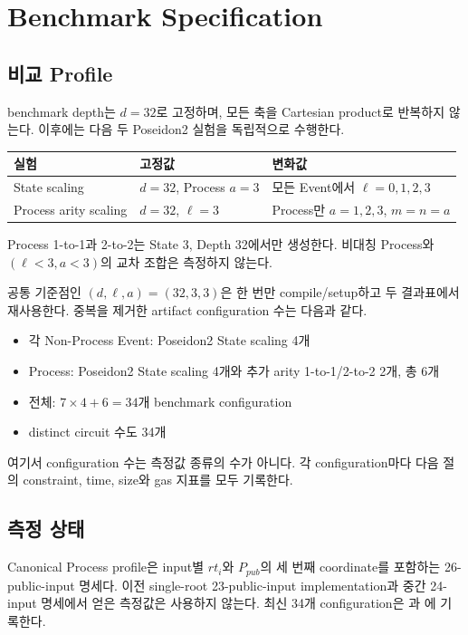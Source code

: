 \documentclass[11pt,a4paper]{extarticle}
\begin{document}
\section{Benchmark Specification}

\subsection{비교 Profile}

benchmark depth는 $d=32$로 고정하며, 모든 축을 Cartesian product로 반복하지 않는다.
이후에는 다음 두 Poseidon2 실험을 독립적으로 수행한다.

\begin{longtable}{@{}p{}p{}p{}@{}}
\toprule
실험 & 고정값 & 변화값 \\
\midrule
\endhead
State scaling & $d=32$, Process $a=3$ & 모든 Event에서
$\ell=0,1,2,3$ \\
Process arity scaling & $d=32$, $\ell=3$ & Process만
$a=1,2,3$, $m=n=a$ \\
\bottomrule
\end{longtable}

Process 1-to-1과 2-to-2는 State 3, Depth 32에서만 생성한다. 비대칭 Process와
$(\ell<3,a<3)$의 교차 조합은 측정하지 않는다.

공통 기준점인 $(d,\ell,a)=(32,3,3)$은 한 번만 compile/setup하고 두 결과표에서
재사용한다. 중복을 제거한 artifact configuration 수는 다음과 같다.

\begin{itemize}
  \item 각 Non-Process Event: Poseidon2 State scaling 4개
  \item Process: Poseidon2 State scaling 4개와 추가 arity 1-to-1/2-to-2 2개, 총 6개
  \item 전체: $7\times4+6=34$개 benchmark configuration
  \item distinct circuit 수도 34개
\end{itemize}

여기서 configuration 수는 측정값 종류의 수가 아니다. 각 configuration마다 다음 절의
constraint, time, size와 gas 지표를 모두 기록한다.

\subsection{측정 상태}

Canonical Process profile은 input별 $rt_i$와 $P_{pub}$의 세 번째 coordinate를 포함하는
26-public-input 명세다. 이전 single-root 23-public-input implementation과 중간 24-input
명세에서 얻은 측정값은 사용하지 않는다. 최신 34개 configuration은
과 에 기록한다.
\end{document}
